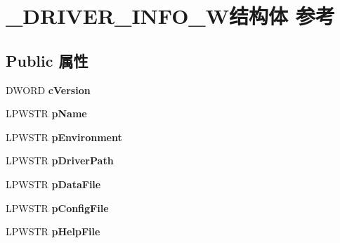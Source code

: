 \hypertarget{struct___d_r_i_v_e_r___i_n_f_o__4_w}{}\section{\+\_\+\+D\+R\+I\+V\+E\+R\+\_\+\+I\+N\+F\+O\+\_\+W结构体 参考}
\label{struct___d_r_i_v_e_r___i_n_f_o__4_w}
\subsection*{Public 属性}
\begin{DoxyCompactItemize}
\item 
\mbox{\label{struct___d_r_i_v_e_r___i_n_f_o__4_w_ad2a38e6cec6de392d918ef5bb900d898}} 
D\+W\+O\+RD {\bfseries c\+Version}
\item 
\mbox{\label{struct___d_r_i_v_e_r___i_n_f_o__4_w_ac9ef0fa9b103102aacda45162f712308}} 
L\+P\+W\+S\+TR {\bfseries p\+Name}
\item 
\mbox{\label{struct___d_r_i_v_e_r___i_n_f_o__4_w_a01d13e1fd8d97684dc5a0bfe221a229f}} 
L\+P\+W\+S\+TR {\bfseries p\+Environment}
\item 
\mbox{\label{struct___d_r_i_v_e_r___i_n_f_o__4_w_a7ad4a78787a674ec47eeeeee35494019}} 
L\+P\+W\+S\+TR {\bfseries p\+Driver\+Path}
\item 
\mbox{\label{struct___d_r_i_v_e_r___i_n_f_o__4_w_a972190d04778a870569dae23a4c18d55}} 
L\+P\+W\+S\+TR {\bfseries p\+Data\+File}
\item 
\mbox{\label{struct___d_r_i_v_e_r___i_n_f_o__4_w_ac33fae0f394967222f4b43c348075a0e}} 
L\+P\+W\+S\+TR {\bfseries p\+Config\+File}
\item 
\mbox{\label{struct___d_r_i_v_e_r___i_n_f_o__4_w_aed4ed6bbed01bc99a0ad1585d476e26d}} 
L\+P\+W\+S\+TR {\bfseries p\+Help\+File}
\item 
\mbox{\label{struct___d_r_i_v_e_r___i_n_f_o__4_w_a4a1637c0bb7e7e843eff8a476cff3c26}} 

\end{DoxyCompactItemize}
